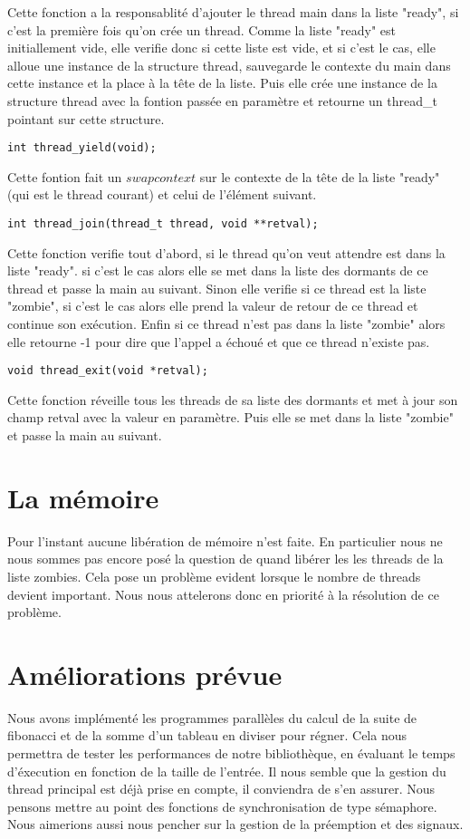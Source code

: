\documentclass[12pt]{article}
\begin{document}
Cette fonction a la responsablité d'ajouter le thread main dans la
liste "ready", si c'est la première fois qu'on crée un thread.  Comme
la liste "ready" est initiallement vide, elle verifie donc si cette
liste est vide, et si c'est le cas, elle alloue une instance de la
structure thread, sauvegarde le contexte du main dans cette instance
et la place à la tête de la liste.  Puis elle crée une instance de la
structure thread avec la fontion passée en paramètre et retourne un
thread\_t pointant sur cette structure.  ~~\\
\begin{verbatim}
int thread_yield(void);
\end{verbatim}
Cette fontion fait un $swapcontext$ sur le contexte de la tête de la
liste "ready" (qui est le thread courant) et celui de l'élément
suivant.  ~~\\
\begin{verbatim}
int thread_join(thread_t thread, void **retval);
\end{verbatim}
Cette fonction verifie tout d'abord, si le thread qu'on veut attendre
est dans la liste "ready". si c'est le cas alors elle se met dans la
liste des dormants de ce thread et passe la main au suivant.  Sinon
elle verifie si ce thread est la liste "zombie", si c'est le cas alors
elle prend la valeur de retour de ce thread et continue son exécution.
Enfin si ce thread n'est pas dans la liste "zombie" alors elle
retourne -1 pour dire que l'appel a échoué et que ce thread n'existe
pas.  ~~\\
\begin{verbatim}
void thread_exit(void *retval);
\end{verbatim}
Cette fonction réveille tous les threads de sa liste des dormants et
met à jour son champ retval avec la valeur en paramètre. Puis elle se
met dans la liste "zombie" et passe la main au suivant.

\section{La mémoire}
Pour l'instant aucune libération de mémoire n'est faite. En
particulier nous ne nous sommes pas encore posé la question de quand
libérer les les threads de la liste zombies. Cela pose un problème
evident lorsque le nombre de threads devient important. Nous nous
attelerons donc en priorité à la résolution de ce problème.

\section{Améliorations prévue}
Nous avons implémenté les programmes parallèles du calcul de la suite
de fibonacci et de la somme d'un tableau en diviser pour régner. Cela
nous permettra de tester les performances de notre bibliothèque, en
évaluant le temps d'éxecution en fonction de la taille de l'entrée.
Il nous semble que la gestion du thread principal est déjà prise en
compte, il conviendra de s'en assurer. Nous pensons mettre au point
des fonctions de synchronisation de type sémaphore. Nous aimerions
aussi nous pencher sur la gestion de la préemption et des signaux.
\end{document}
